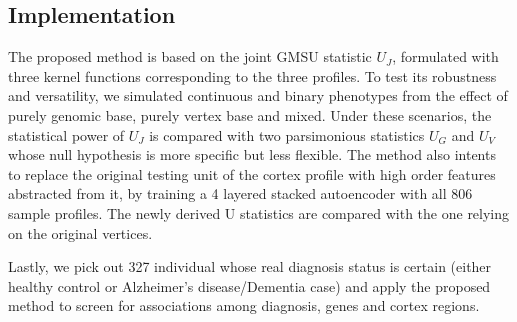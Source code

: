 \subsection{Implementation}
The proposed method is based on the joint GMSU statistic $U_J$, formulated with three kernel functions corresponding to the three profiles. To test its robustness and versatility, we simulated continuous and binary phenotypes from the effect of purely genomic base, purely vertex base and mixed. Under these scenarios, the statistical power of $U_J$ is compared with two parsimonious statistics $U_G$ and $U_V$ whose null hypothesis is more specific but less flexible.
The method also intents to replace the original testing unit of the cortex profile with high order features abstracted from it, by training a 4 layered stacked autoencoder with all 806 sample profiles. The newly derived U statistics are compared with the one relying on the original vertices.

Lastly, we pick out 327 individual whose real diagnosis status is certain (either healthy control or Alzheimer's disease/Dementia case) and apply the proposed method to screen for associations among diagnosis, genes and cortex regions.